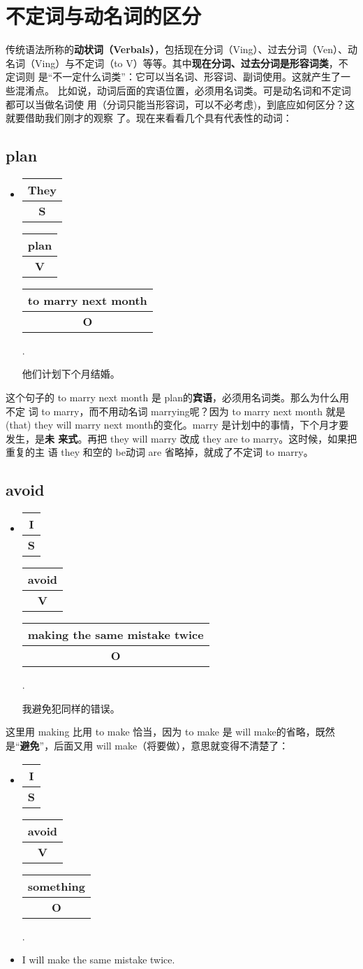 \documentclass{yufa}
\makeatletter
\newcommand\unct[2]{\def\arraystretch{0.8}
  {\setlength{\tabcolsep}{0pt}
    \begin{tabular}[t]{@{}c@{}} \setlength\arrayrulewidth{0.8pt} \textbf{#1}\\\hline \textbf{\small #2} \\\end{tabular}}}
\makeatother
\begin{document}
\section{不定词与动名词的区分}

传统语法所称的\textbf{动状词（Verbals）}，包括现在分词（Ving）、过去分词（Ven）、动
名词（Ving）与不定词（to V）等等。其中\textbf{现在分词、过去分词是形容词类}，不定词则
是“不一定什么词类”：它可以当名词、形容词、副词使用。这就产生了一些混淆点。
比如说，动词后面的宾语位置，必须用名词类。可是动名词和不定词都可以当做名词使
用（分词只能当形容词，可以不必考虑)，到底应如何区分？这就要借助我们刚才的观察
了。现在来看看几个具有代表性的动词：

\subsection{plan}

\begin{itemize}
\item  \unct{They}{S} \unct{plan}{V} \unct{to marry next month}{O}.

  他们计划下个月结婚。
\end{itemize}

这个句子的 to marry next month 是 plan的\textbf{宾语}，必须用名词类。那么为什么用不定
词 to marry，而不用动名词 marrying呢？因为 to marry next month 就是 (that)
they will marry next month的变化。marry 是计划中的事情，下个月才要发生，是\textbf{未
  来式}。再把 they will marry 改成 they are to marry。这时候，如果把重复的主
语 they 和空的 be动词 are 省略掉，就成了不定词 to marry。

\subsection{avoid}

\begin{itemize}
\item  \unct{I}{S} \unct{avoid}{V} \unct{making the same mistake twice}{O}.

  我避免犯同样的错误。
\end{itemize}

这里用 making 比用 to make 恰当，因为 to make 是 will make的省略，既然
是“\textbf{避免}”，后面又用 will make（将要做），意思就变得不清楚了：

\begin{itemize}
\item  \unct{I}{S} \unct{avoid}{V} \unct{something}{O}.
\item  I will make the same mistake twice.
\end{itemize}
\end{document}
